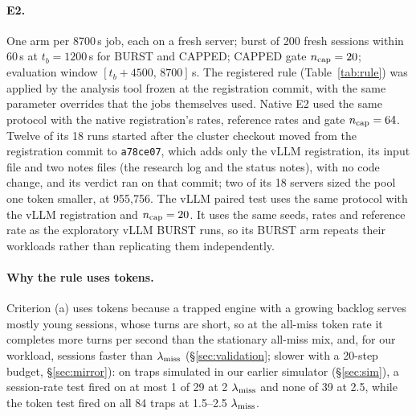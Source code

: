 \paragraph{E2.} One arm per 8700\,s job, each on a fresh server; burst of 200 fresh sessions within 60\,s at $t_b=1200$\,s for BURST and CAPPED; CAPPED gate $n_{\mathrm{cap}}=20$; evaluation window $[t_b+4500,\,8700]$\,s. The registered rule (Table~\ref{tab:rule}) was applied by the analysis tool frozen at the registration commit, with the same parameter overrides that the jobs themselves used. Native E2 used the same protocol with the native registration's rates, reference rates and gate $n_{\mathrm{cap}}=64$. Twelve of its 18 runs started after the cluster checkout moved from the registration commit to \texttt{a78ce07}, which adds only the vLLM registration, its input file and two notes files (the research log and the status notes), with no code change, and its verdict ran on that commit; two of its 18 servers sized the pool one token smaller, at 955,756. The vLLM paired test uses the same protocol with the vLLM registration and $n_{\mathrm{cap}}=20$. It uses the same seeds, rates and reference rate as the exploratory vLLM BURST runs, so its BURST arm repeats their workloads rather than replicating them independently.

\paragraph{Why the rule uses tokens.} Criterion (a) uses tokens because a trapped engine with a growing backlog serves mostly young sessions, whose turns are short, so at the all-miss token rate it completes more turns per second than the stationary all-miss mix, and, for our workload, sessions faster than $\lambda_{\mathrm{miss}}$ (\S\ref{sec:validation}; slower with a 20-step budget, \S\ref{sec:mirror}): on traps simulated in our earlier simulator (\S\ref{sec:sim}), a session-rate test fired on at most 1 of 29 at 2 $\lambda_{\mathrm{miss}}$ and none of 39 at 2.5, while the token test fired on all 84 traps at 1.5--2.5 $\lambda_{\mathrm{miss}}$.

